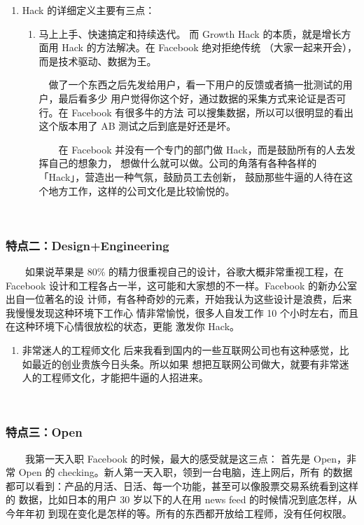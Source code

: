\documentclass[11pt]{ctexart}
\begin{document}
\begin{enumerate}
\item Hack 的详细定义主要有三点：
\label{sec:orgheadline11}

\begin{enumerate}
\item 马上上手、快速搞定和持续迭代。
\label{sec:orgheadline10}
而 Growth Hack 的本质，就是增长方面用 Hack 的方法解决。在 Facebook 绝对拒绝传统
（大家一起来开会），而是技术驱动、数据为王。

　做了一个东西之后先发给用户，看一下用户的反馈或者搞一批测试的用户，最后看多少
用户觉得你这个好，通过数据的采集方式来论证是否可行。在 Facebook 有很多牛的方法
可以搜集数据，所以可以很明显的看出这个版本用了 AB 测试之后到底是好还是坏。

　　在 Facebook 并没有一个专门的部门做 Hack，而是鼓励所有的人去发挥自己的想象力，
想做什么就可以做。公司的角落有各种各样的「Hack」，营造出一种气氛，鼓励员工去创新，
鼓励那些牛逼的人待在这个地方工作，这样的公司文化是比较愉悦的。

　　
\end{enumerate}
\end{enumerate}

\subsubsection{特点二：Design+Engineering}
\label{sec:orgheadline14}
　　如果说苹果是 80\% 的精力很重视自己的设计，谷歌大概非常重视工程，在 Facebook
设计和工程各占一半，这可能和大家想的不一样。Facebook 的新办公室出自一位著名的设
计师，有各种奇妙的元素，开始我认为这些设计是浪费，后来我慢慢发现这种环境下工作心
情非常愉悦，很多人自发工作 10 个小时左右，而且在这种环境下心情很放松的状态，更能
激发你 Hack。

\begin{enumerate}
\item 非常迷人的工程师文化
\label{sec:orgheadline13}
    后来我看到国内的一些互联网公司也有这种感觉，比如最近的创业贵族今日头条。所以如果
想把互联网公司做大，就要有非常迷人的工程师文化，才能把牛逼的人招进来。


　　
\end{enumerate}

\subsubsection{特点三：Open}
\label{sec:orgheadline16}
　　我第一天入职 Facebook 的时候，最大的感受就是这三点：
首先是 Open，非常 Open 的 checking。新人第一天入职，领到一台电脑，连上网后，所有
的数据都可以看到：产品的月活、日活、每一个功能，甚至可以像股票交易系统看到这样的
数据，比如日本的用户 30 岁以下的人在用 news feed 的时候情况到底怎样，从今年年初
到现在变化是怎样的等。所有的东西都开放给工程师，没有任何权限。
\end{document}
